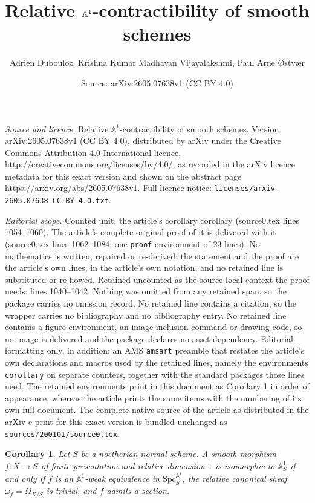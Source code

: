 \documentclass[10pt,a4paper]{amsart}
\title{Relative $\AA^{1}$-contractibility of smooth schemes}
\author{Adrien Dubouloz, Krishna Kumar Madhavan Vijayalakshmi, Paul Arne {\O}stv{\ae}r}
\date{Source: arXiv:2605.07638v1 (CC BY 4.0)}
\newtheorem{corollary}{Corollary}
\renewcommand{\AA}{\mathbb{A}}
\begin{document}
\maketitle

\noindent\emph{Source and licence.} Relative $\AA^{1}$-contractibility of smooth schemes. Version arXiv:2605.07638v1 (CC BY 4.0), distributed by arXiv under the Creative Commons Attribution 4.0 International licence, http://creativecommons.org/licenses/by/4.0/, as recorded in the arXiv licence metadata for this exact version and shown on the abstract page https://arxiv.org/abs/2605.07638v1. Full licence notice: \texttt{licenses/arxiv-2605.07638-CC-BY-4.0.txt}.\par\smallskip

\noindent\textit{Editorial scope.} Counted unit: the article's corollary corollary (source0.tex lines 1054--1060). The article's complete original proof of it is delivered with it (source0.tex lines 1062--1084, one \texttt{proof} environment of 23 lines). No mathematics is written, repaired or re-derived: the statement and the proof are the article's own lines, in the article's own notation, and no retained line is substituted or re-flowed.  Retained uncounted as the source-local context the proof needs: lines 1040--1042.  Nothing was omitted from any retained span, so the package carries no omission record.  No retained line contains a citation, so the wrapper carries no bibliography and no bibliography entry.  No retained line contains a figure environment, an image-inclusion command or drawing code, so no image is delivered and the package declares no asset dependency.  Editorial formatting only, in addition: an AMS \texttt{amsart} preamble that restates the article's own declarations and macros used by the retained lines, namely the environments \texttt{corollary} on separate counters, together with the standard packages those lines need.  The retained environments print in this document as Corollary 1 in order of appearance, whereas the article prints the same items with the numbering of its own full document.  The complete native source of the article as distributed in the arXiv e-print for this exact version is bundled unchanged as \texttt{sources/200101/source0.tex}.
\begin{corollary}\label{A1unique:DD}
Let $S$ be a noetherian normal scheme. A smooth morphism $f:X\to S$ of finite presentation and relative dimension $1$ is isomorphic to $\AA^1_S$ if and only if $f$ is an $\AA^1$-weak equivalence in $\mathrm{Spc}_S^{\AA^1}$, the relative canonical sheaf $\omega_f=\Omega_{X/S}$ is trivial, and $f$ admits a section.
\end{corollary}
\end{document}
